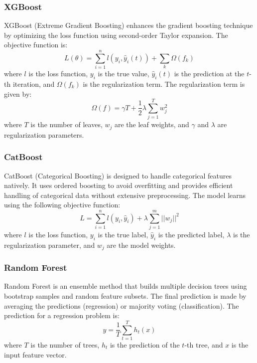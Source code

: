 \subsubsection{XGBoost}
XGBoost (Extreme Gradient Boosting) enhances the gradient boosting technique by optimizing the loss function using second-order Taylor expansion. The objective function is:
\begin{equation*}
L(\theta) = \sum_{i=1}^{n} l(y_i, \hat{y}_i(t)) + \sum_{k} \Omega(f_k)
\end{equation*}
where $l$ is the loss function, $y_i$ is the true value, $\hat{y}_i(t)$ is the prediction at the $t$-th iteration, and $\Omega(f_k)$ is the regularization term. The regularization term is given by:
\begin{equation*}
\Omega(f) = \gamma T + \frac{1}{2} \lambda \sum_{j=1}^{T} w_j^2
\end{equation*}
where $T$ is the number of leaves, $w_j$ are the leaf weights, and $\gamma$ and $\lambda$ are regularization parameters.

\subsubsection{CatBoost}
CatBoost (Categorical Boosting) is designed to handle categorical features natively. It uses ordered boosting to avoid overfitting and provides efficient handling of categorical data without extensive preprocessing. The model learns using the following objective function:
\begin{equation*}
L = \sum_{i=1}^{n} l(y_i, \hat{y}_i) + \lambda \sum_{j=1}^{m} ||w_j||^2
\end{equation*}
where $l$ is the loss function, $y_i$ is the true label, $\hat{y}_i$ is the predicted label, $\lambda$ is the regularization parameter, and $w_j$ are the model weights.

\subsubsection{Random Forest}
Random Forest is an ensemble method that builds multiple decision trees using bootstrap samples and random feature subsets. The final prediction is made by averaging the predictions (regression) or majority voting (classification). The prediction for a regression problem is:
\begin{equation*}
\hat{y} = \frac{1}{T} \sum_{t=1}^{T} h_t(x)
\end{equation*}
where $T$ is the number of trees, $h_t$ is the prediction of the $t$-th tree, and $x$ is the input feature vector.

